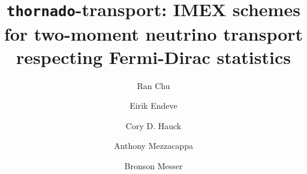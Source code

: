 \documentclass[a4paper]{jpconf}
\begin{document}
\title{\texttt{thornado}-transport: IMEX schemes for two-moment neutrino transport respecting Fermi-Dirac statistics}

\author{Ran Chu}
\address{Department of Physics and Astronomy, University of Tennessee, Knoxville, TN 37996-1200}

\author{Eirik Endeve}
\address{Computational and Applied Mathematics Group, Oak Ridge National Laboratory, Oak Ridge, TN 37831 USA}
\address{Department of Physics and Astronomy, University of Tennessee, Knoxville, TN 37996-1200}
\address{Joint Institute for Computational Sciences, Oak Ridge National Laboratory, Oak Ridge, TN 37831 USA}

\author{Cory D. Hauck}
\address{Computational and Applied Mathematics Group, Oak Ridge National Laboratory, Oak Ridge, TN 37831 USA}
\address{Department of Mathematics, University of Tennessee, Knoxville, TN 37996-1320}

\author{Anthony Mezzacappa}
\address{Department of Physics and Astronomy, University of Tennessee, Knoxville, TN 37996-1200}
\address{Joint Institute for Computational Sciences, Oak Ridge National Laboratory, Oak Ridge, TN 37831 USA}

\author{Bronson Messer}
\address{Scientific Computing and Theoretical Physics Groups, Oak Ridge National Laboratory, Oak Ridge, TN 37831 USA}
\address{Department of Physics and Astronomy, University of Tennessee, Knoxville, TN 37996-1200}
\end{document}
